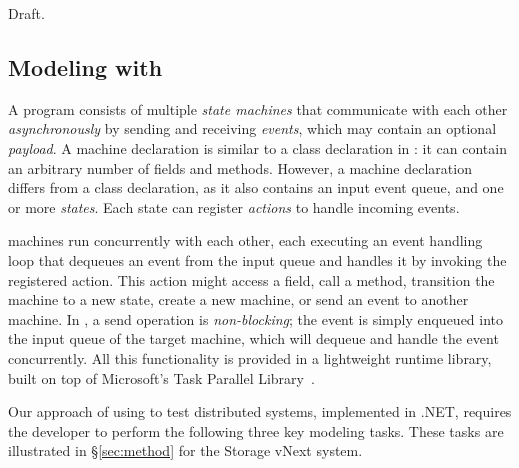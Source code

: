 Draft.

\subsection{Modeling with \psharp}
\label{sec:overview:psharp}

A \psharp program consists of multiple \emph{state machines} that communicate with each other \emph{asynchronously} by sending and receiving \emph{events}, which may contain an optional \emph{payload}. A \psharp machine declaration is similar to a class declaration in \csharp: it can contain an arbitrary number of fields and methods. However, a machine declaration differs from a class declaration, as it also contains an input event queue, and one or more \emph{states}. Each state can register \emph{actions} to handle incoming events.

\psharp machines run concurrently with each other, each executing an event handling loop that dequeues an event from the input queue and handles it by invoking the registered action. This action might access a field, call a method, transition the machine to a new state, create a new machine, or send an event to another machine. In \psharp, a send operation is \emph{non-blocking}; the event is simply enqueued into the input queue of the target machine, which will dequeue and handle the event concurrently. All this functionality is provided in a lightweight runtime library, built on top of Microsoft's Task Parallel Library~\cite{leijen2009tpl}.

Our approach of using \psharp to test distributed systems, implemented in .NET, requires the developer to perform the following three key modeling tasks. These tasks are illustrated in \S\ref{sec:method} for the \Azure Storage vNext system.

